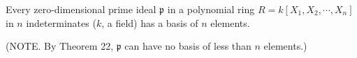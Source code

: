 Every zero-dimensional prime ideal $\mathfrak{p}$ in a polynomial ring $R = k[X_1, X_2, \cdots, X_n]$ in $n$ indeterminates ($k$, a field) has a basis of $n$ elements.

(NOTE. By Theorem 22, $\mathfrak{p}$ can have no basis of less than $n$ elements.)